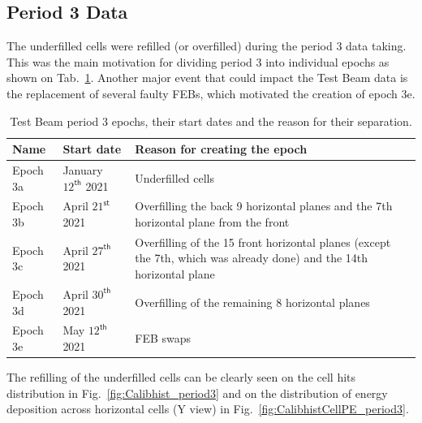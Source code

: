 \subsection{Period 3 Data}\label{sec:TBCalibration_period3}
The underfilled cells were refilled (or overfilled) during the period 3 data taking. This was the main motivation for dividing period 3 into individual epochs as shown on Tab.~\ref{tab:TestBeamPeriod3Epochs}. Another major event that could impact the Test Beam data is the replacement of several faulty \gls{FEB}s, which motivated the creation of epoch 3e.

\begin{table}[!ht]
\centering
\caption[Description of Test Beam period 3 epochs]{Test Beam period 3 epochs, their start dates and the reason for their separation.}
\def\arraystretch{1.4}
\begin{tabular}{m{} m{} m{}}
Name & Start date & Reason for creating the epoch\\\hline
Epoch 3a & January $12^{\textsf{th}}$ 2021 & Underfilled cells\\
Epoch 3b & April $21^{\textsf{st}}$ 2021 & Overfilling the back 9 horizontal planes and the 7th horizontal plane from the front\\
Epoch 3c & April $27^{\textsf{th}}$ 2021 & Overfilling of the 15 front horizontal planes (except the 7th, which was already done) and the 14th horizontal plane\\
Epoch 3d & April $30^{\textsf{th}}$ 2021 & Overfilling of the remaining 8 horizontal planes\\
Epoch 3e & May $12^{\textsf{th}}$ 2021 & FEB swaps
\end{tabular}
\label{tab:TestBeamPeriod3Epochs}
\end{table}

The refilling of the underfilled cells can be clearly seen on the cell hits distribution in Fig.~\ref{fig:Calibhist_period3} and on the distribution of energy deposition across horizontal cells (Y view) in Fig.~\ref{fig:CalibhistCellPE_period3}.

